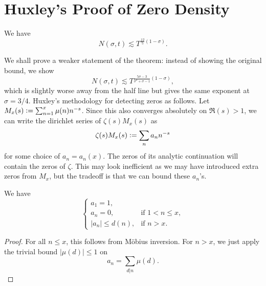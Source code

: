 \section{Huxley's Proof of Zero Density}
\begin{theorem}[Huxley]
    We have  \[
    N(\sigma,t)\lesssim T^{\frac{12}{5}(1-\sigma)}.
    \]
\end{theorem}
We shall prove a weaker statement of the theorem: instead of showing the original bound, we show \[
    N(\sigma,t)\lesssim T^{\frac{5\sigma-3}{\sigma^2+\sigma-1}(1-\sigma)},
\]which is slightly worse away from the half line but gives the same exponent at $\sigma=3/4$.
Huxley's methodology for detecting zeros as follows. Let $M_x(s) \mathrel{\mathop:}= \sum_{n=1}^{x} \mu(n)n^{-s}$. Since this also converges absolutely on $\Re(s)>1$, we can write the dirichlet series of $\zeta(s) M_x (s)$ as \[
    \zeta(s) M_x (s) \mathrel{\mathop:}= \sum_{n}a_n n^{-s}
\]
for some choice of $a_n=a_n(x)$. The zeros of its analytic continuation will contain the zeros of $\zeta$. This may look inefficient as we may have introduced extra zeros from $M_x$, but the tradeoff is that we can bound these $a_n$'s.
\begin{proposition}
    We have  \[\begin{cases}
        a_1 = 1, & \\
        a_n = 0, & \textrm{if $1<n\leq x$},\\
        |a_n|\leq d(n), & \textrm{if $n>x$}.
    \end{cases}\]
\end{proposition}
\begin{proof}
    For all $n\leq x$, this follows from M\"obius inversion. For $n>x$, we just apply the trivial bound $|\mu(d)|\leq 1$ on \[
    a_n  = \sum_{d|n} \mu(d) .
    \]
\end{proof}

